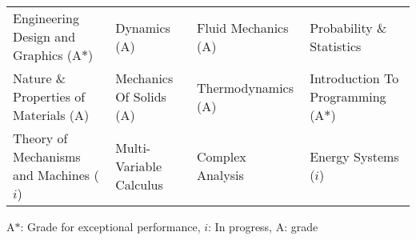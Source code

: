 
\begin{tabular*}{\textwidth}{l l l l}
  Engineering Design and Graphics (A$*$)& Dynamics (A) & Fluid Mechanics (A)  & Probability \& Statistics\\
  Nature \& Properties of Materials (A) & Mechanics Of Solids (A) & Thermodynamics (A) & Introduction To Programming (A$*$)\\
  Theory of Mechanisms and Machines ($i$) & Multi-Variable Calculus & Complex Analysis & Energy Systems ($i$)

\end{tabular*}
{\footnotesize
    {A$*$: Grade for exceptional performance, $i$: In progress, A: grade}
}
